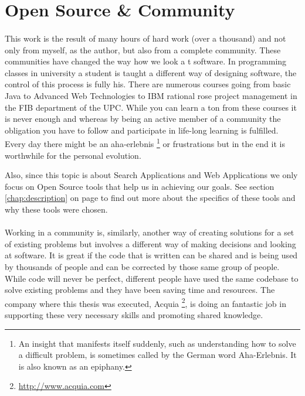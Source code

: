 \section{Open Source \& Community}
\paragraph{}
This work is the result of many hours of hard work (over a thousand) and not only from myself, as the author, but also from a complete community. These communities have changed the way how we look a
t software. In programming classes in university a student is taught a different way of designing software, the control of this process is fully his. There are numerous courses going from basic Java to Advanced Web Technologies to IBM rational rose project management in the FIB department of the UPC. While you can learn a ton from these courses it is never enough and whereas by being an active member of a community the obligation you have to follow and participate in life-long learning is fulfilled. Every day there might be an aha-erlebnis \footnote{An insight that manifests itself suddenly, such as understanding how to solve a difficult problem, is sometimes called by the German word Aha-Erlebnis. It is also known as an epiphany.} or frustrations but in the end it is worthwhile for the personal evolution. 

Also, since this topic is about Search Applications and Web Applications we only focus on Open Source tools that help us in achieving our goals. See section \ref{chap:description} on page \pageref{chap:description} to find out more about the specifics of these tools and why these tools were chosen. 

\paragraph{}
Working in a community is, similarly, another way of creating solutions for a set of existing problems but involves a different way of making decisions and looking at software. It is great if the code that is written can be shared and is being used by thousands of people and can be corrected by those same group of people. While code will never be perfect, different people have used the same codebase to solve existing problems and they have been saving time and resources. The company where this thesis was executed, Acquia \footnote{\url{http://www.acquia.com}}, is doing an fantastic job in supporting these very necessary skills and promoting shared knowledge.

